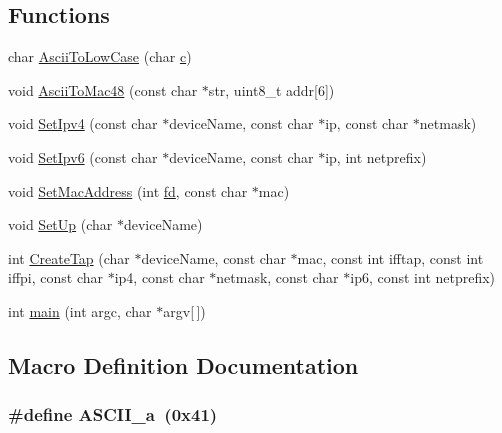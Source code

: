 \subsection*{Functions}
\begin{DoxyCompactItemize}
\item 
char \hyperlink{tap-device-creator_8cc_ab8379009ba610cccb1b541338521de6c}{Ascii\+To\+Low\+Case} (char \hyperlink{mmwave_2model_2fading-traces_2fading__trace__generator_8m_ae0323a9039add2978bf5b49550572c7c}{c})
\item 
void \hyperlink{tap-device-creator_8cc_a9c187f003617baea6ff2ded1043595c4}{Ascii\+To\+Mac48} (const char $\ast$str, uint8\+\_\+t addr\mbox{[}6\mbox{]})
\item 
void \hyperlink{tap-device-creator_8cc_a44a9cb13d1cbecebf361fd7ccd1a374b}{Set\+Ipv4} (const char $\ast$device\+Name, const char $\ast$ip, const char $\ast$netmask)
\item 
void \hyperlink{tap-device-creator_8cc_a102f6f0b268284e9849b029966bdff56}{Set\+Ipv6} (const char $\ast$device\+Name, const char $\ast$ip, int netprefix)
\item 
void \hyperlink{tap-device-creator_8cc_ace2e6e4957bebb5dd5d93dcaa917cc19}{Set\+Mac\+Address} (int \hyperlink{mmwave_2model_2fading-traces_2fading__trace__generator_8m_a44f21d5190b5a6df8089f54799628d7e}{fd}, const char $\ast$mac)
\item 
void \hyperlink{tap-device-creator_8cc_ab1a65327983ffdcbff3023b6fed670b9}{Set\+Up} (char $\ast$device\+Name)
\item 
int \hyperlink{tap-device-creator_8cc_adfa72932b0318d125690937ebc451338}{Create\+Tap} (char $\ast$device\+Name, const char $\ast$mac, const int ifftap, const int iffpi, const char $\ast$ip4, const char $\ast$netmask, const char $\ast$ip6, const int netprefix)
\item 
int \hyperlink{tap-device-creator_8cc_a0ddf1224851353fc92bfbff6f499fa97}{main} (int argc, char $\ast$argv\mbox{[}$\,$\mbox{]})
\end{DoxyCompactItemize}


\subsection{Macro Definition Documentation}
\subsubsection[{\texorpdfstring{A\+S\+C\+I\+I\+\_\+a}{ASCII_a}}]{\setlength{\rightskip}{0pt plus 5cm}\#define A\+S\+C\+I\+I\+\_\+a~(0x41)}\hypertarget{tap-device-creator_8cc_acb0c7653dabe53da8a7fb03bcad505e7}{}\label{tap-device-creator_8cc_acb0c7653dabe53da8a7fb03bcad505e7}
